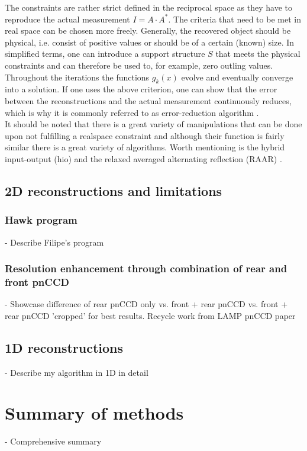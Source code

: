 The constraints are rather strict defined in the reciprocal space as they have to reproduce the actual measurement $I=A\cdot A^{*}$. The criteria that need to be met in real space can be chosen more freely. Generally, the recovered object should be physical, i.e. consist of positive values or should be of a certain (known) size. In simplified terms, one can introduce a support structure $S$ that meets the physical constraints and can therefore be used to, for example, zero outling values. Throughout the iterations the functions $g_{k}(x)$ evolve and eventually converge into a solution. If one uses the above criterion, one can show that the error between the reconstructions and the actual measurement continuously reduces, which is why it is commonly referred to as error-reduction algorithm \cite{Fienup-1978-OL}.\\
It should be noted that there is a great variety of manipulations that can be done upon not fulfilling a realspace constraint and although their function is fairly similar there is a great variety of algorithms. Worth mentioning is the hybrid input-output (hio) \cite{Fienup-1978-OL} and the relaxed averaged alternating reflection (RAAR) \cite{Luke-2005-IP}.
%
%
%
%
\subsection{2D reconstructions and limitations}
\subsubsection{Hawk program}
- Describe Filipe's program
\subsubsection{Resolution enhancement through combination of rear and front pnCCD}
- Showcase difference of rear pnCCD only vs. front + rear pnCCD vs. front + rear pnCCD 'cropped' for best results. Recycle work from LAMP pnCCD paper
\subsection{1D reconstructions}
- Describe my algorithm in 1D in detail
\section{Summary of methods}
- Comprehensive summary 